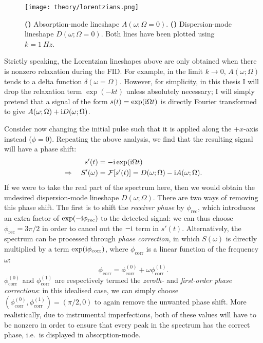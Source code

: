 \begin{figure}[htbp]
    \centering
    \texttt{[image: theory/lorentzians.png]}
    {\label{fig:lorentzians_absorption}}
    {\label{fig:lorentzians_dispersion}}
    \caption[Absorption- and dispersion-mode Lorentzian lineshapes]{
        \textbf{()} Absorption-mode lineshape $A(\omega; \Omega = 0)$.
        \textbf{()} Dispersion-mode lineshape $D(\omega; \Omega = 0)$.
        Both lines have been plotted using $k = \SI{1}{Hz}$.
    }
    \label{fig:lorentzians}
\end{figure}

Strictly speaking, the Lorentzian lineshapes above are only obtained when there is nonzero relaxation during the FID.
For example, in the limit $k \to 0$, $A(\omega; \Omega)$ tends to a delta function $\delta(\omega = \Omega)$.
However, for simplicity, in this thesis I will drop the relaxation term $\exp(-kt)$ unless absolutely necessary; I will simply pretend that a signal of the form $s(t) = \exp(\mathrm{i} \Omega t)$ is directly Fourier transformed to give $A(\omega; \Omega) + \mathrm{i} D(\omega; \Omega)$.

Consider now changing the initial pulse such that it is applied along the $+x$-axis instead ($\phi = 0$).
Repeating the above analysis, we find that the resulting signal will have a phase shift:
\begin{align}
    \label{eq:fid_phase_shifted}
    s'(t) &= -\mathrm{i}\exp(\mathrm{i}\Omega t) \\
    \Rightarrow \quad S'(\omega) &= \mathcal{F}[s'(t)] = D(\omega;\Omega) - \mathrm{i} A(\omega;\Omega).
\end{align}
If we were to take the real part of the spectrum here, then we would obtain the undesired dispersion-mode lineshape $D(\omega;\Omega)$.
There are two ways of removing this phase shift.
The first is to shift the \textit{receiver phase} by $\phi_\text{rec}$, which introduces an extra factor of $\exp(-\mathrm{i}\phi_\text{rec})$ to the detected signal: we can thus choose $\phi_\text{rec} = 3\pi/2$ in order to cancel out the $-\mathrm{i}$ term in $s'(t)$.
Alternatively, the spectrum can be processed through \textit{phase correction}, in which $S(\omega)$ is directly multiplied by a term $\exp(\mathrm{i}\phi_\text{corr})$, where $\phi_\text{corr}$ is a linear function of the frequency $\omega$:
\begin{equation}
    \label{eq:phase_correction}
    \phi_\text{corr} = \phi_{\text{corr}}^{(0)} + \omega\phi_{\text{corr}}^{(1)}.
\end{equation}
$\phi_\text{corr}^{(0)}$ and $\phi_\text{corr}^{(1)}$ are respectively termed the \textit{zeroth-} and \textit{first-order phase corrections}: in this idealised case, we can simply choose $(\phi_\text{corr}^{(0)}, \phi_\text{corr}^{(1)}) = (\pi/2, 0)$ to again remove the unwanted phase shift.
More realistically, due to instrumental imperfections, both of these values will have to be nonzero in order to ensure that every peak in the spectrum has the correct phase, i.e.\ is displayed in absorption-mode.

